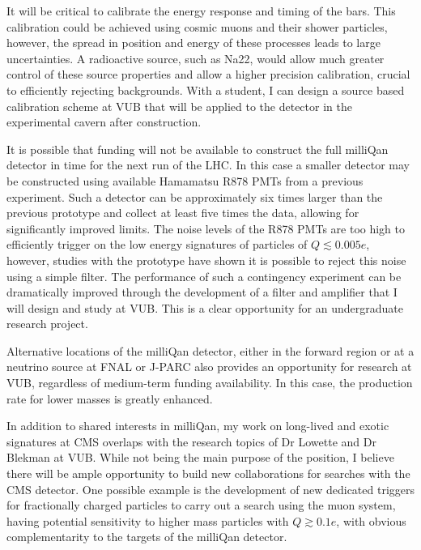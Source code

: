 \documentclass[11pt]{article}
\theoremstyle{plain} \numberwithin{equation}{section}
\theoremstyle{definition}
\begin{document}
It will be critical to calibrate the energy response and timing of the bars. 
This calibration could be achieved using cosmic muons and their shower particles, 
however, the spread in position and energy of these processes
leads to large uncertainties. A radioactive source, such as Na22, would allow much greater control 
of these source properties and allow a higher precision calibration, crucial to efficiently 
rejecting backgrounds. With a student, I can design a source based calibration scheme 
at VUB that will be applied to the detector in the experimental cavern after construction.

It is possible that funding will not be available to construct the full milliQan detector in
time for the next run of the LHC. In this case a smaller 
detector may be constructed using available Hamamatsu R878 PMTs from a previous experiment. 
Such a detector can be approximately six times
larger than the previous prototype and collect at least five times the data, allowing for
significantly improved limits. The noise levels of the R878 PMTs are too high to efficiently 
trigger on the low energy signatures of particles of $Q \lesssim 0.005 e$, however, studies with the prototype
have shown it is possible to reject this noise using a simple filter. The performance of
such a contingency experiment can be dramatically improved through the development of a
filter and amplifier that I will design and study at VUB. This is a clear opportunity 
for an undergraduate research project.

Alternative locations of the milliQan detector, either in the forward region or at a neutrino source 
at FNAL or J-PARC also provides an opportunity for research at VUB, 
regardless of medium-term funding availability. In this case, the production rate 
for lower masses is greatly enhanced.

In addition to shared interests in milliQan, my work on long-lived and exotic signatures
at CMS overlaps with the research topics of Dr Lowette and Dr Blekman at VUB. 
While not being the main purpose of the position, I believe there will be ample opportunity
to build new collaborations for searches with the CMS detector. One possible example
is the development of new dedicated triggers for fractionally 
charged particles to carry out a search using the muon system, having potential
sensitivity to higher mass particles with $Q \gtrsim 0.1 e$, with obvious complementarity 
to the targets of the milliQan detector.
\end{document}
